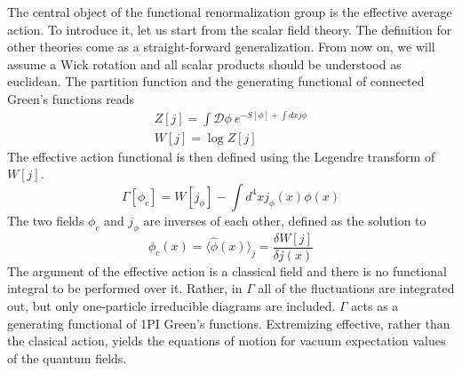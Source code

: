 \documentclass[11pt, a4paper]{article}
\begin{document}


The central object of the functional renormalization group is the effective average action.
To introduce it, let us start from the scalar field theory. The definition for other theories come as a straight-forward generalization.
From now on, we will assume a Wick rotation
and all scalar products should be understood as euclidean.
The partition function and the generating functional of connected Green's functions reads
\begin{gather}
    Z[j] = \int \mathcal{D}\phi \ e^{-S[\phi] + \int dx j \phi} \\
    W[j] = \log{Z[j]}
\end{gather}
The effective action functional is then defined using the Legendre transform of $W[j]$.
\begin{equation}
    \Gamma[\phi_c] = W[j_\phi] - \int d^4 x j_\phi(x) \phi(x)
\end{equation}
The two fields $\phi_c$ and $j_\phi$ are inverses of each other, defined as the solution to
\begin{equation}
    \phi_c(x) = \langle \hat\phi (x) \rangle_j = \frac{\delta W[j]}{\delta j(x)}
\end{equation}
The argument of the effective action is a classical field and there is no functional integral to be performed over it.
Rather, in $\Gamma$ all of the fluctuations are integrated out, but only one-particle irreducible diagrams
are included. $\Gamma$ acts as a generating functional of 1PI Green's functions. Extremizing effective, rather than
the clasical action, yields the equations of motion for vacuum expectation values of the quantum fields.
\end{document}
